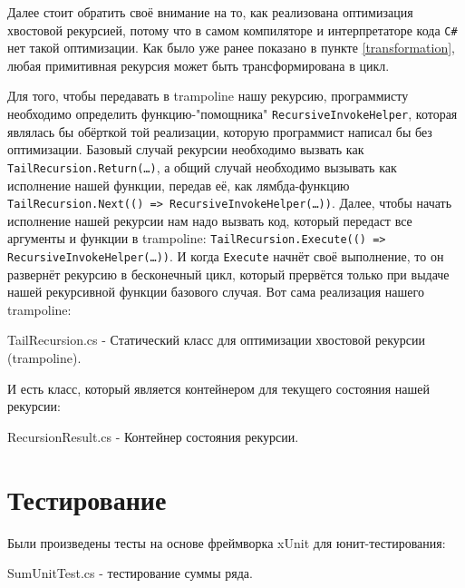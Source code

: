 Далее стоит обратить своё внимание на то, как реализована оптимизация хвостовой рекурсией, потому что в самом компиляторе и интерпретаторе кода \texttt{C\#} нет такой оптимизации.
Как было уже ранее показано в пункте \ref{transformation}, любая примитивная рекурсия может быть трансформирована в цикл.

Для того, чтобы передавать в trampoline нашу рекурсию, программисту необходимо определить функцию-"помощника" \texttt{RecursiveInvokeHelper}, которая являлась бы обёрткой той реализации, которую программист написал бы без оптимизации. 
Базовый случай рекурсии необходимо вызвать как \texttt{TailRecursion.Return(\dots)}, а общий случай необходимо вызывать как исполнение нашей функции, передав её, как лямбда-функцию \texttt{TailRecursion.Next(() => RecursiveInvokeHelper(\dots))}. 
Далее, чтобы начать исполнение нашей рекурсии нам надо вызвать код, который передаст все аргументы и функции в trampoline: \texttt{TailRecursion.Execute(() => RecursiveInvokeHelper(\dots))}. И когда \texttt{Execute} начнёт своё выполнение, то он развернёт рекурсию в бесконечный цикл, который прервётся только при выдаче нашей рекурсивной функции базового случая. 
Вот сама реализация нашего trampoline:

\begin{code}
	
	\caption{TailRecursion.cs - Статический класс для оптимизации хвостовой рекурсии (trampoline).}
\end{code}

И есть класс, который является контейнером для текущего состояния нашей рекурсии:

\begin{code}
	
	\caption{RecursionResult.cs - Контейнер состояния рекурсии.}
\end{code}

\newpage
\section{Тестирование}

Были произведены тесты на основе фреймворка xUnit для юнит-тестирования:

\begin{code}
	
	\caption{SumUnitTest.cs - тестирование суммы ряда.}
\end{code}

